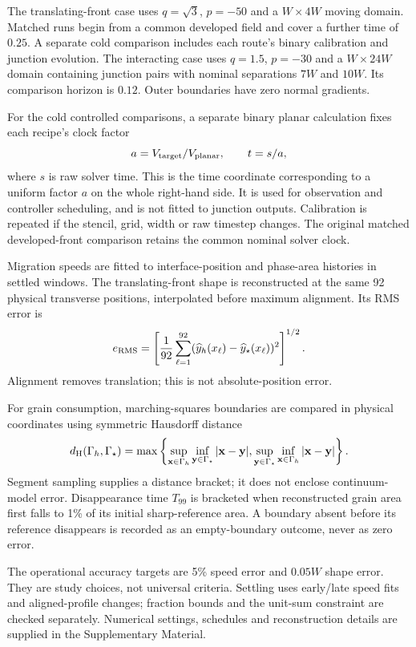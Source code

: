 The translating-front case uses $q=\sqrt3$, $p=-50$ and a $W\times4W$ moving domain. Matched runs begin from a common developed field and cover a further time of $0.25$. A separate cold comparison includes each route's binary calibration and junction evolution. The interacting case uses $q=1.5$, $p=-30$ and a $W\times24W$ domain containing junction pairs with nominal separations $7W$ and $10W$. Its comparison horizon is $0.12$. Outer boundaries have zero normal gradients.

For the cold controlled comparisons, a separate binary planar calculation fixes each recipe's clock factor
\begin{equation}
 a=V_{\rm target}/V_{\rm planar},\qquad t=s/a ,
 \label{eq:clock}
\end{equation}
where $s$ is raw solver time. This is the time coordinate corresponding to a uniform factor $a$ on the whole right-hand side. It is used for observation and controller scheduling, and is not fitted to junction outputs. Calibration is repeated if the stencil, grid, width or raw timestep changes. The original matched developed-front comparison retains the common nominal solver clock.

Migration speeds are fitted to interface-position and phase-area histories in settled windows. The translating-front shape is reconstructed at the same 92 physical transverse positions, interpolated before maximum alignment. Its RMS error is
\begin{equation}
 e_{\mathrm{RMS}}=\left[\frac1{92}\sum_{\ell=1}^{92}
 (\widehat y_h(x_\ell)-\widehat y_\star(x_\ell))^2\right]^{1/2}.
 \label{eq:rms}
\end{equation}
Alignment removes translation; this is not absolute-position error.

For grain consumption, marching-squares boundaries are compared in physical coordinates using symmetric Hausdorff distance
\begin{equation}
 d_{\mathrm H}(\Gamma_h,\Gamma_\star)=
 \max\left\{\sup_{\mathbf x\in\Gamma_h}\inf_{\mathbf y\in\Gamma_\star}|\mathbf x-\mathbf y|,
 \sup_{\mathbf y\in\Gamma_\star}\inf_{\mathbf x\in\Gamma_h}|\mathbf x-\mathbf y|\right\}.
 \label{eq:hausdorff}
\end{equation}
Segment sampling supplies a distance bracket; it does not enclose continuum-model error. Disappearance time $T_{99}$ is bracketed when reconstructed grain area first falls to 1\% of its initial sharp-reference area. A boundary absent before its reference disappears is recorded as an empty-boundary outcome, never as zero error.

The operational accuracy targets are 5\% speed error and $0.05W$ shape error. They are study choices, not universal criteria. Settling uses early/late speed fits and aligned-profile changes; fraction bounds and the unit-sum constraint are checked separately. Numerical settings, schedules and reconstruction details are supplied in the Supplementary Material.
